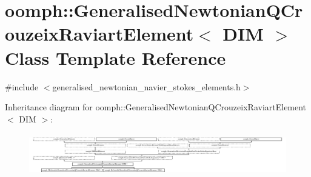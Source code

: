\hypertarget{classoomph_1_1GeneralisedNewtonianQCrouzeixRaviartElement}{}\section{oomph\+:\+:Generalised\+Newtonian\+Q\+Crouzeix\+Raviart\+Element$<$ D\+IM $>$ Class Template Reference}
\label{classoomph_1_1GeneralisedNewtonianQCrouzeixRaviartElement}


{\ttfamily \#include $<$generalised\+\_\+newtonian\+\_\+navier\+\_\+stokes\+\_\+elements.\+h$>$}

Inheritance diagram for oomph\+:\+:Generalised\+Newtonian\+Q\+Crouzeix\+Raviart\+Element$<$ D\+IM $>$\+:\begin{figure}[H]
\begin{center}
\leavevmode
\includegraphics[height=1.870824cm]{classoomph_1_1GeneralisedNewtonianQCrouzeixRaviartElement}
\end{center}
\end{figure}
